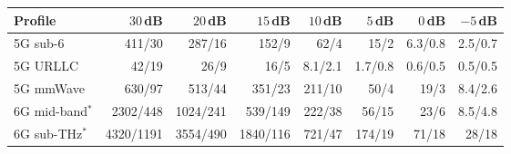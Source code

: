 \begin{tabular}{@{}lrrrrrrr@{}}
\toprule
Profile & $30$\,dB & $20$\,dB & $15$\,dB & $10$\,dB & $5$\,dB & $0$\,dB & $-5$\,dB \\
\midrule
5G sub-6 & 411/30 & 287/16 & 152/9 & 62/4 & 15/2 & 6.3/0.8 & 2.5/0.7 \\
5G URLLC & 42/19 & 26/9 & 16/5 & 8.1/2.1 & 1.7/0.8 & 0.6/0.5 & 0.5/0.5 \\
5G mmWave & 630/97 & 513/44 & 351/23 & 211/10 & 50/4 & 19/3 & 8.4/2.6 \\
6G mid-band$^\ast$ & 2302/448 & 1024/241 & 539/149 & 222/38 & 56/15 & 23/6 & 8.5/4.8 \\
6G sub-THz$^\ast$ & 4320/1191 & 3554/490 & 1840/116 & 721/47 & 174/19 & 71/18 & 28/18 \\
\bottomrule
\end{tabular}
